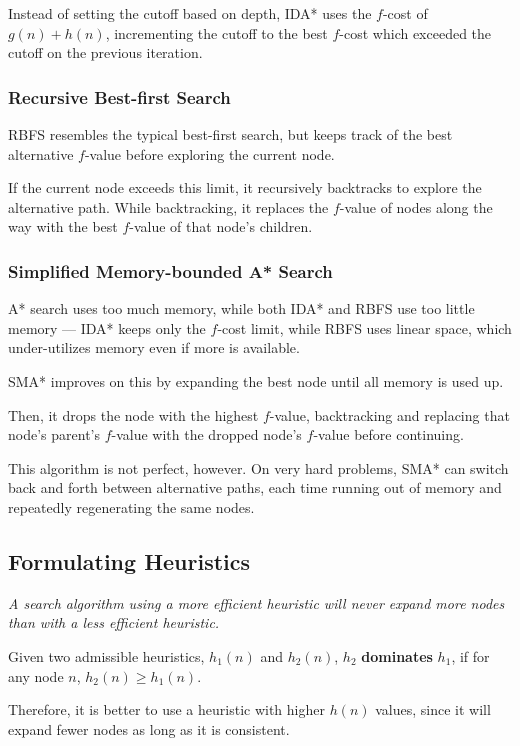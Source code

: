 \begin{multicols*}{2}
            Instead of setting the cutoff based on depth, IDA* uses the $f$-cost of $g(n) + h(n)$, incrementing the cutoff to the best $f$-cost which exceeded the cutoff on the previous iteration.

            \subsubsection{Recursive Best-first Search}
            RBFS resembles the typical best-first search, but keeps track of the best alternative $f$-value before exploring the current node.

            If the current node exceeds this limit, it recursively backtracks to explore the alternative path. While backtracking, it replaces the $f$-value of nodes along the way with the best $f$-value of that node's children.

            \subsubsection{Simplified Memory-bounded A* Search}
            A* search uses too much memory, while both IDA* and RBFS use too little memory --- IDA* keeps only the $f$-cost limit, while RBFS uses linear space, which under-utilizes memory even if more is available.

            SMA* improves on this by expanding the best node until all memory is used up.

            Then, it drops the node with the highest $f$-value, backtracking and replacing that node's parent's $f$-value with the dropped node's $f$-value before continuing.

            This algorithm is not perfect, however. On very hard problems, SMA* can switch back and forth between alternative paths, each time running out of memory and repeatedly regenerating the same nodes.

        \subsection{Formulating Heuristics}
            \emph{A search algorithm using a more efficient heuristic will never expand more nodes than with a less efficient heuristic.}

            Given two admissible heuristics, $h_1(n)$ and $h_2(n)$, $h_2$ \textbf{dominates} $h_1$, if for any node $n$, $h_2(n) \ge h_1(n)$.

            Therefore, it is better to use a heuristic with higher $h(n)$ values, since it will expand fewer nodes as long as it is consistent.


\end{multicols*}

